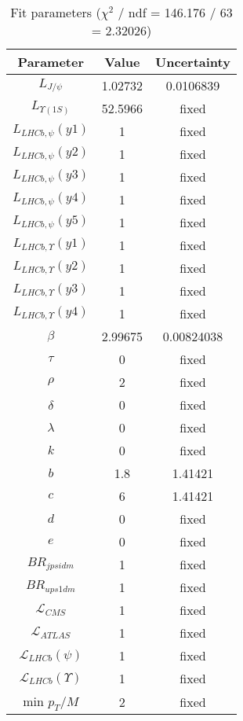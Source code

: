 \begin{table}
\centering
\begin{tabular}{c|c|c}
Parameter & Value & Uncertainty \\
\hline
$L_{J/\psi}$ & 1.02732 & 0.0106839 \\
$L_{\Upsilon(1S)}$ & 52.5966 & fixed \\
$L_{LHCb,\psi}(y1)$ & 1 & fixed \\
$L_{LHCb,\psi}(y2)$ & 1 & fixed \\
$L_{LHCb,\psi}(y3)$ & 1 & fixed \\
$L_{LHCb,\psi}(y4)$ & 1 & fixed \\
$L_{LHCb,\psi}(y5)$ & 1 & fixed \\
$L_{LHCb,\Upsilon}(y1)$ & 1 & fixed \\
$L_{LHCb,\Upsilon}(y2)$ & 1 & fixed \\
$L_{LHCb,\Upsilon}(y3)$ & 1 & fixed \\
$L_{LHCb,\Upsilon}(y4)$ & 1 & fixed \\
$\beta$ & 2.99675 & 0.00824038 \\
$\tau$ & 0 & fixed \\
$\rho$ & 2 & fixed \\
$\delta$ & 0 & fixed \\
$\lambda$ & 0 & fixed \\
$k$ & 0 & fixed \\
$b$ & 1.8 & 1.41421 \\
$c$ & 6 & 1.41421 \\
$d$ & 0 & fixed \\
$e$ & 0 & fixed \\
$BR_{jpsidm}$ & 1 & fixed \\
$BR_{ups1dm}$ & 1 & fixed \\
$\mathcal L_{CMS}$ & 1 & fixed \\
$\mathcal L_{ATLAS}$ & 1 & fixed \\
$\mathcal L_{LHCb}(\psi)$ & 1 & fixed \\
$\mathcal L_{LHCb}(\Upsilon)$ & 1 & fixed \\
min $p_T/M$ & 2 & fixed \\
\end{tabular}
\caption{Fit parameters ($\chi^2$ / ndf = 146.176 / 63 = 2.32026)}
\end{table}
